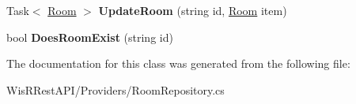 \begin{DoxyCompactItemize}
\item 
\hypertarget{class_wis_r_rest_a_p_i_1_1_domain_model_1_1_room_repository_aad838ee205987309f9faedac115e35a1}{}Task$<$ \hyperlink{class_wis_r_1_1_domain_models_1_1_room}{Room} $>$ {\bfseries Update\+Room} (string id, \hyperlink{class_wis_r_1_1_domain_models_1_1_room}{Room} item)\label{class_wis_r_rest_a_p_i_1_1_domain_model_1_1_room_repository_aad838ee205987309f9faedac115e35a1}

\item 
\hypertarget{class_wis_r_rest_a_p_i_1_1_domain_model_1_1_room_repository_a21c7c28425830d61a976b13bd45e0c3c}{}bool {\bfseries Does\+Room\+Exist} (string id)\label{class_wis_r_rest_a_p_i_1_1_domain_model_1_1_room_repository_a21c7c28425830d61a976b13bd45e0c3c}

\end{DoxyCompactItemize}


The documentation for this class was generated from the following file\+:\begin{DoxyCompactItemize}
\item 
Wis\+R\+Rest\+A\+P\+I/\+Providers/Room\+Repository.\+cs\end{DoxyCompactItemize}
